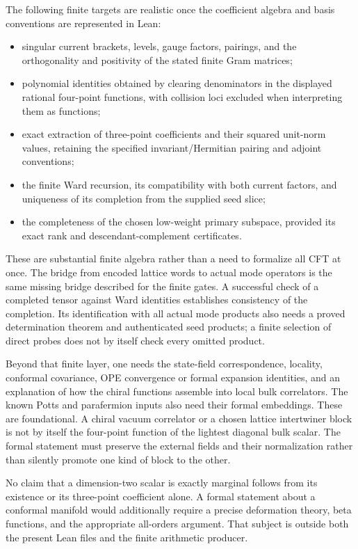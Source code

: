 The following finite targets are realistic once the coefficient
algebra and basis conventions are represented in Lean:
\begin{itemize}
\item singular current brackets, levels, gauge factors, pairings, and
the orthogonality and positivity of the stated finite Gram matrices;
\item polynomial identities obtained by clearing denominators in
the displayed rational four-point functions, with collision loci
excluded when interpreting them as functions;
\item exact extraction of three-point coefficients and their squared
unit-norm values, retaining the specified invariant/Hermitian pairing
and adjoint conventions;
\item the finite Ward recursion, its compatibility with both current
factors, and uniqueness of its completion from the supplied seed slice;
\item the completeness of the chosen low-weight primary subspace,
provided its exact rank and descendant-complement certificates.
\end{itemize}
These are substantial finite algebra rather than a need to formalize
all CFT at once. The bridge from encoded lattice words to actual mode
operators is the same missing bridge described for the finite gates.
A successful check of a completed tensor against Ward identities
establishes consistency of the completion. Its identification with
all actual mode products also needs a proved determination theorem
and authenticated seed products; a finite selection of direct probes
does not by itself check every omitted product.

Beyond that finite layer, one needs the state-field correspondence,
locality, conformal covariance, OPE convergence or formal expansion
identities, and an explanation of how the chiral functions assemble
into local bulk correlators. The known Potts and parafermion inputs
also need their formal embeddings. These are foundational. A chiral
vacuum correlator or a chosen lattice intertwiner block is not by
itself the four-point function of the lightest diagonal bulk scalar.
The formal statement must preserve the external fields and their
normalization rather than silently promote one kind of block to the
other.

No claim that a dimension-two scalar is exactly marginal follows
from its existence or its three-point coefficient alone. A formal
statement about a conformal manifold would additionally require a
precise deformation theory, beta functions, and the appropriate
all-orders argument. That subject is outside both the present Lean
files and the finite arithmetic producer.

